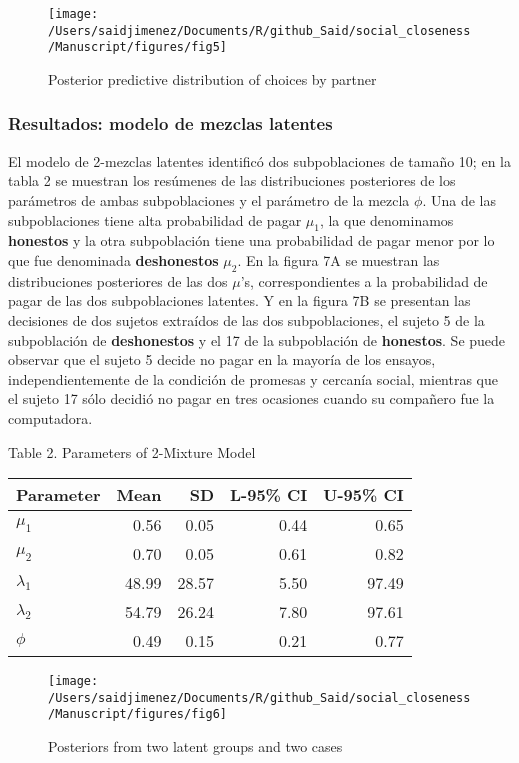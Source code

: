 \documentclass[]{article}
\begin{document}
\begin{figure}

{\centering \texttt{[image: /Users/saidjimenez/Documents/R/github\_Said/social\_closeness/Manuscript/figures/fig5]} 

}

\caption{Posterior predictive distribution of choices by partner}\label{fig:fig6}
\end{figure}

\subsubsection{Resultados: modelo de mezclas
latentes}\label{resultados-modelo-de-mezclas-latentes}

El modelo de 2-mezclas latentes identificó dos subpoblaciones de tamaño
10; en la tabla 2 se muestran los resúmenes de las distribuciones
posteriores de los parámetros de ambas subpoblaciones y el parámetro de
la mezcla \(\phi\). Una de las subpoblaciones tiene alta probabilidad de
pagar \(\mu_1\), la que denominamos \textbf{honestos} y la otra
subpoblación tiene una probabilidad de pagar menor por lo que fue
denominada \textbf{deshonestos} \(\mu_2\). En la figura 7A se muestran
las distribuciones posteriores de las dos \(\mu\)'s, correspondientes a
la probabilidad de pagar de las dos subpoblaciones latentes. Y en la
figura 7B se presentan las decisiones de dos sujetos extraídos de las
dos subpoblaciones, el sujeto 5 de la subpoblación de
\textbf{deshonestos} y el 17 de la subpoblación de \textbf{honestos}. Se
puede observar que el sujeto 5 decide no pagar en la mayoría de los
ensayos, independientemente de la condición de promesas y cercanía
social, mientras que el sujeto 17 sólo decidió no pagar en tres
ocasiones cuando su compañero fue la computadora.

Table 2. Parameters of 2-Mixture Model

\begin{longtable}[]{@{}lrrrr@{}}
\toprule
Parameter & Mean & SD & L-95\% CI & U-95\% CI\tabularnewline
\midrule
\endhead
\(\mu_{1}\) & 0.56 & 0.05 & 0.44 & 0.65\tabularnewline
\(\mu_{2}\) & 0.70 & 0.05 & 0.61 & 0.82\tabularnewline
\(\lambda_{1}\) & 48.99 & 28.57 & 5.50 & 97.49\tabularnewline
\(\lambda_{2}\) & 54.79 & 26.24 & 7.80 & 97.61\tabularnewline
\(\phi\) & 0.49 & 0.15 & 0.21 & 0.77\tabularnewline
\bottomrule
\end{longtable}

\begin{figure}

{\centering \texttt{[image: /Users/saidjimenez/Documents/R/github\_Said/social\_closeness/Manuscript/figures/fig6]} 

}

\caption{Posteriors from two latent groups and two cases}\label{fig:fig7}
\end{figure}
\end{document}
